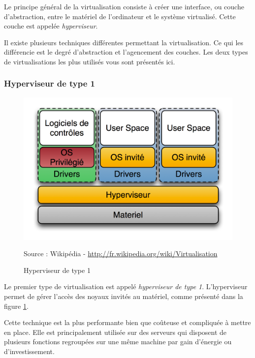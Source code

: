 Le principe général de la virtualisation consiste à créer une interface, ou couche d'abstraction, entre le matériel de l'ordinateur et le système virtualisé.
Cette couche est appelée \textit{hyperviseur}.

Il existe plusieurs techniques différentes permettant la virtualisation.
Ce qui les différencie est le degré d'abstraction et l'agencement des couches.
Les deux types de virtualisations les plus utilisés vous sont présentés ici. 
\\




\subsubsection{Hyperviseur de type 1}

\begin{figure}[!h]
	\center
	\includegraphics[scale=0.7]{images/Hyperviseur_type1.png}
	\caption{Hyperviseur de type 1}
	Source : Wikipédia - \href{http://fr.wikipedia.org/wiki/Virtualisation}{http://fr.wikipedia.org/wiki/Virtualisation}
	\label{Schéma Hyperviseur 1}
\end{figure}

Le premier type de virtualisation est appelé \textit{hyperviseur de type 1}.
L'hyperviseur permet de gérer l'accès des noyaux invités au matériel, comme présenté dans la figure \ref{Schéma Hyperviseur 1}.

Cette technique est la plus performante bien que coûteuse et compliquée à mettre en place.
Elle est principalement utilisée sur des serveurs qui disposent de plusieurs fonctions regroupées sur une même machine par gain d'énergie ou d'investissement.
\\




